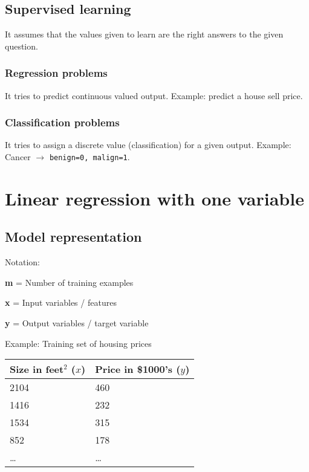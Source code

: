 \documentclass[a4paper]{report}
\begin{document}
  \section {Supervised learning}

    It assumes that the values given to learn are the right answers to the
    given question.

    \subsection{Regression problems}

      It tries to predict continuous valued output. Example: predict a house
      sell price.
      
    \subsection{Classification problems}

      It tries to assign a discrete value (classification) for a given output.
      Example: Cancer $\rightarrow$ \texttt{benign=0, malign=1}.


  \chapter{Linear regression with one variable}

    \section{Model representation}

      Notation:

      \textbf{m} = Number of training examples

      \textbf{x} = Input variables / features

      \textbf{y} = Output variables / target variable

      Example: Training set of housing prices

      \begin{center}
        \begin{tabular}{ | l | l |}
          \hline
          Size in feet$^2$ ($x$) & Price in \$1000's ($y$) \\ \hline
          2104 & 460 \\ \hline
          1416 & 232 \\ \hline
          1534 & 315 \\ \hline
          852  & 178 \\ \hline
          \ldots & \ldots \\ \hline
        \end{tabular}
      \end{center}
\end{document}
